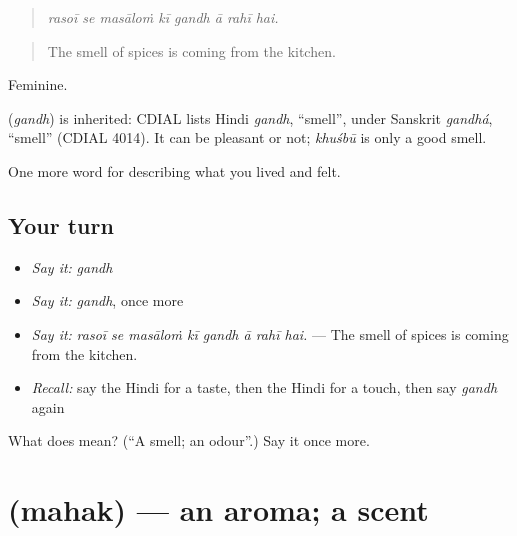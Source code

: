 \begin{quote}
       
\end{quote}

\begin{quote}
\emph{rasoī se masāloṁ kī gandh ā rahī hai.}
\end{quote}

\begin{quote}
The smell of spices is coming from the kitchen.
\end{quote}

Feminine.

\begin{cousinweb}
\textbf{} (\emph{gandh}) is inherited: CDIAL lists Hindi \emph{gandh}, \textquotedblleft{}smell\textquotedblright{}, under Sanskrit \emph{gandhá}, \textquotedblleft{}smell\textquotedblright{} (CDIAL 4014). It can be pleasant or not; \emph{khuśbū} is only a good smell.
\end{cousinweb}

\begin{grammarlens}[title={What you've built}]
One more word for describing what you lived and felt.
\end{grammarlens}

\subsection*{Your turn}
\begin{itemize}
\raggedright
  \item \emph{Say it:} \emph{gandh}
  \item \emph{Say it:} \emph{gandh}, once more
  \item \emph{Say it:} \emph{rasoī se masāloṁ kī gandh ā rahī hai.} — The smell of spices is coming from the kitchen.
  \item \emph{Recall:} say the Hindi for a taste, then the Hindi for a touch, then say \emph{gandh} again
\end{itemize}

\begin{tcolorbox}[breakable,colback=teal!4,colframe=teal!35!black,title={Before you move on}]
What does  mean? (\textquotedblleft{}A smell; an odour\textquotedblright{}.) Say it once more.
\end{tcolorbox}
\section[\texorpdfstring{\hi{महक} (mahak)}{महक (mahak)}]{ (mahak) — an aroma; a scent}

